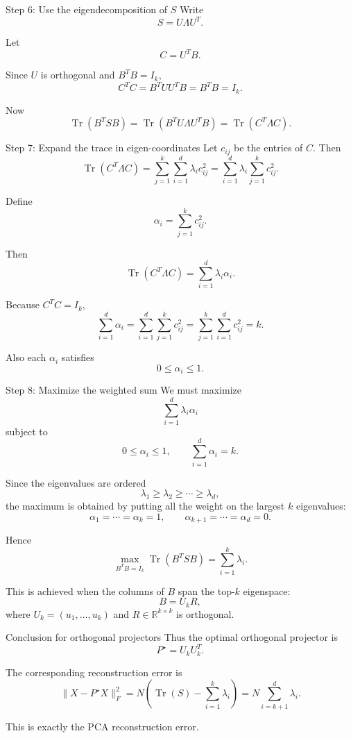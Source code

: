 \documentclass[aspectratio=169]{beamer}
\begin{document}
\begin{frame}{Step 6: Use the eigendecomposition of \(S\)}
Write
\[
S = U\Lambda U^T.
\]

Let
\[
C = U^T B.
\]

Since \(U\) is orthogonal and \(B^TB=I_k\),
\[
C^TC = B^TUU^TB = B^TB = I_k.
\]

Now
\[
\operatorname{Tr}(B^TSB)
=
\operatorname{Tr}(B^TU\Lambda U^TB)
=
\operatorname{Tr}(C^T\Lambda C).
\]
\end{frame}

\begin{frame}{Step 7: Expand the trace in eigen-coordinates}
Let \(c_{ij}\) be the entries of \(C\). Then
\[
\operatorname{Tr}(C^T\Lambda C)
=
\sum_{j=1}^k \sum_{i=1}^d \lambda_i c_{ij}^2
=
\sum_{i=1}^d \lambda_i \sum_{j=1}^k c_{ij}^2.
\]

Define
\[
\alpha_i = \sum_{j=1}^k c_{ij}^2.
\]

Then
\[
\operatorname{Tr}(C^T\Lambda C)=\sum_{i=1}^d \lambda_i \alpha_i.
\]

Because \(C^TC=I_k\),
\[
\sum_{i=1}^d \alpha_i
=
\sum_{i=1}^d \sum_{j=1}^k c_{ij}^2
=
\sum_{j=1}^k \sum_{i=1}^d c_{ij}^2
=
k.
\]

Also each \(\alpha_i\) satisfies
\[
0\le \alpha_i \le 1.
\]
\end{frame}

\begin{frame}{Step 8: Maximize the weighted sum}
We must maximize
\[
\sum_{i=1}^d \lambda_i \alpha_i
\]
subject to
\[
0\le \alpha_i \le 1,
\qquad
\sum_{i=1}^d \alpha_i = k.
\]

Since the eigenvalues are ordered
\[
\lambda_1\ge \lambda_2\ge \cdots \ge \lambda_d,
\]
the maximum is obtained by putting all the weight on the largest \(k\) eigenvalues:
\[
\alpha_1=\cdots=\alpha_k=1,
\qquad
\alpha_{k+1}=\cdots=\alpha_d=0.
\]

Hence
\[
\max_{B^TB=I_k}\operatorname{Tr}(B^TSB)
=
\sum_{i=1}^k \lambda_i.
\]

This is achieved when the columns of \(B\) span the top-\(k\) eigenspace:
\[
B = U_k R,
\]
where \(U_k=(u_1,\dots,u_k)\) and \(R\in \mathbb{R}^{k\times k}\) is orthogonal.
\end{frame}

\begin{frame}{Conclusion for orthogonal projectors}
Thus the optimal orthogonal projector is
\[
P^\star = U_k U_k^T.
\]

The corresponding reconstruction error is
\[
\|X-P^\star X\|_F^2
=
N\left(\operatorname{Tr}(S)-\sum_{i=1}^k \lambda_i\right)
=
N\sum_{i=k+1}^d \lambda_i.
\]

This is exactly the PCA reconstruction error.
\end{frame}
\end{document}
